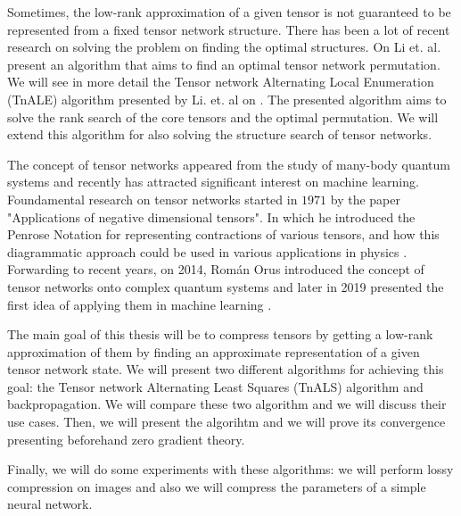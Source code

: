 \documentclass[11pt,a4paper,openright,oneside]{book}
\numberwithin{equation}{section}
\begin{document}
Sometimes, the low-rank approximation of a given tensor is not guaranteed to be represented from
a fixed tensor network structure. There has been a lot of recent research on solving
the problem on finding the optimal structures. On \cite{liPermutationSearchTensor2022} Li et. al. 
present an algorithm that aims to find an optimal tensor network permutation.
We will see in more detail the Tensor network Alternating Local Enumeration (\gls{TnALE}) algorithm presented
by Li. et. al on \cite{liAlternatingLocalEnumeration2023}. The presented algorithm aims to
solve the rank search of the core tensors and the optimal permutation. We will extend this algorithm
for also solving the structure search of tensor networks.

The concept of tensor networks appeared from the study of many-body quantum systems \cite{orusTensorNetworksComplex2019}
and recently has attracted significant interest on machine learning. 
Foundamental research on tensor networks started
in $1971$ by the paper "Applications of negative dimensional tensors". In which
he introduced the Penrose Notation for representing contractions of various tensors, and how this
diagrammatic approach could be used in various applications in physics \cite{biamonteLecturesQuantumTensor2020}. Forwarding
to recent years, on 2014, Román Orus \cite{181204011TensorNetworks} introduced the concept of tensor networks onto complex quantum
systems \cite{181204011TensorNetworks} and later in 2019 presented the first
idea of applying them in machine learning \cite{orusTensorNetworksComplex2019}.

The main goal of this thesis will be to compress tensors by getting a low-rank approximation of them by
finding an approximate representation of a given tensor network state. We will present two different algorithms
for achieving this goal: the Tensor network Alternating Least Squares (\gls{TnALS}) algorithm and backpropagation. We will compare these two algorithm and we will
discuss their use cases. Then, we will present the  algorihtm and we will prove its convergence
presenting beforehand zero gradient theory.

Finally, we will do some experiments with these algorithms: we will perform lossy compression on images and
also we will compress the parameters of a simple neural network.

\end{document}
